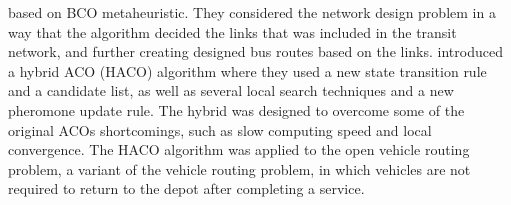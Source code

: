based on BCO metaheuristic. They considered the network design problem in a way that the algorithm decided the links that was included in the transit network, and further creating designed bus routes based on the links. \citet{sedighpour14} introduced a hybrid ACO (HACO) algorithm where they used a new state transition rule and a candidate list, as well as several local search techniques and a new pheromone update rule. The hybrid was designed to overcome some of the original ACOs shortcomings, such as slow computing speed and local convergence. The HACO algorithm was applied to the open vehicle routing problem, a variant of the vehicle routing problem, in which vehicles are not required to return to the depot after completing a service. 


